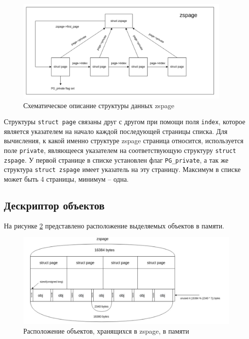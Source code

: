 \begin{figure}[h]
	\centering
	\includegraphics[width=0.95\textwidth]{img/zspage.png}
	\caption{Схематическое описание структуры данных zspage}
	\label{fig:zspage}
\end{figure}

Структуры \texttt{struct page} связаны друг с другом при помощи поля \texttt{index}, которое является указателем на начало каждой последующей страницы списка. Для вычисления, к какой именно структуре zspage страница относится, используется поле \texttt{private}, являющееся указателем на соответствующую структуру \texttt{struct zspage}. У первой странице в списке установлен флаг \texttt{PG\_private}, а так же структура \texttt{struct zspage} имеет указатель на эту страницу. Максимум в списке может быть 4 страницы, минимум -- одна.

\subsection{Дескриптор объектов}

На рисунке \ref{fig:zspage_mem} представлено расположение выделяемых объектов в памяти.

\begin{figure}[h]
	\centering
	\includegraphics[width=\textwidth]{img/zspage_mem.png}
	\caption{Расположение объектов, хранящихся в zspage, в памяти}
	\label{fig:zspage_mem}
\end{figure}

